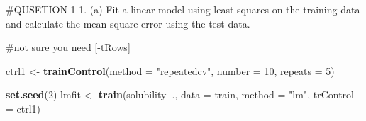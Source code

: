 \documentclass[]{article}
\newenvironment{Shaded}{\begin{snugshade}}{\end{snugshade}}
\newcommand{\DataTypeTok}[1]{\textcolor[rgb]{0.13,0.29,0.53}{#1}}
\newcommand{\DecValTok}[1]{\textcolor[rgb]{0.00,0.00,0.81}{#1}}
\newcommand{\KeywordTok}[1]{\textcolor[rgb]{0.13,0.29,0.53}{\textbf{#1}}}
\newcommand{\NormalTok}[1]{#1}
\newcommand{\OperatorTok}[1]{\textcolor[rgb]{0.81,0.36,0.00}{\textbf{#1}}}
\newcommand{\StringTok}[1]{\textcolor[rgb]{0.31,0.60,0.02}{#1}}
\begin{document}
\begin{Shaded}
\end{Shaded}

\#QUSETION 1 1. (a) Fit a linear model using least squares on the
training data and calculate the mean square error using the test data.

\#not sure you need {[}-tRows{]}

\begin{Shaded}
\begin{Highlighting}[]
\NormalTok{ctrl1 <-}\StringTok{ }\KeywordTok{trainControl}\NormalTok{(}\DataTypeTok{method =} \StringTok{"repeatedcv"}\NormalTok{, }\DataTypeTok{number =} \DecValTok{10}\NormalTok{, }\DataTypeTok{repeats =} \DecValTok{5}\NormalTok{)}

\KeywordTok{set.seed}\NormalTok{(}\DecValTok{2}\NormalTok{)}
\NormalTok{lmfit <-}\StringTok{ }\KeywordTok{train}\NormalTok{(solubility}\OperatorTok{~}\NormalTok{., }
                \DataTypeTok{data =}\NormalTok{ train, }
                \DataTypeTok{method =} \StringTok{"lm"}\NormalTok{, }
                \DataTypeTok{trControl =}\NormalTok{ ctrl1)}
\end{Highlighting}
\end{Shaded}
\end{document}
